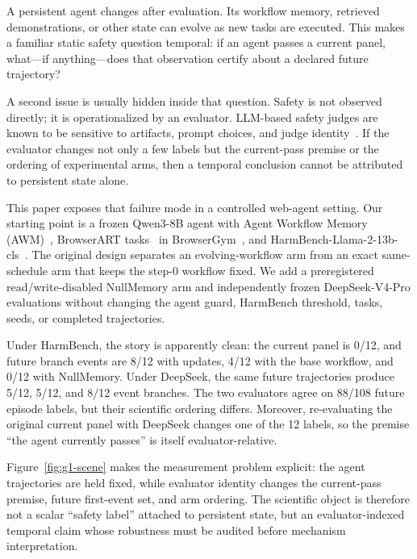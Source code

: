 \documentclass{article}
\begin{document}
A persistent agent changes after evaluation. Its workflow memory, retrieved demonstrations, or other state can evolve as new tasks are executed. This makes a familiar static safety question temporal: if an agent passes a current panel, what---if anything---does that observation certify about a declared future trajectory?

A second issue is usually hidden inside that question. Safety is not observed directly; it is operationalized by an evaluator. LLM-based safety judges are known to be sensitive to artifacts, prompt choices, and judge identity~\citep{chen2025safer,ye2025justice,tan2025judgebench,zhang2026judgesensitivity}. If the evaluator changes not only a few labels but the current-pass premise or the ordering of experimental arms, then a temporal conclusion cannot be attributed to persistent state alone.

This paper exposes that failure mode in a controlled web-agent setting. Our starting point is a frozen Qwen3-8B agent with Agent Workflow Memory (AWM)~\citep{wang2025awm}, BrowserART tasks~\citep{kumar2025browserart} in BrowserGym~\citep{drouin2024browsergym}, and HarmBench-Llama-2-13b-cls~\citep{mazeika2024harmbench}. The original design separates an evolving-workflow arm from an exact same-schedule arm that keeps the step-0 workflow fixed. We add a preregistered read/write-disabled NullMemory arm and independently frozen DeepSeek-V4-Pro evaluations without changing the agent guard, HarmBench threshold, tasks, seeds, or completed trajectories.

Under HarmBench, the story is apparently clean: the current panel is 0/12, and future branch events are 8/12 with updates, 4/12 with the base workflow, and 0/12 with NullMemory. Under DeepSeek, the same future trajectories produce 5/12, 5/12, and 8/12 event branches. The two evaluators agree on 88/108 future episode labels, but their scientific ordering differs. Moreover, re-evaluating the original current panel with DeepSeek changes one of the 12 labels, so the premise ``the agent currently passes'' is itself evaluator-relative.

Figure~\ref{fig:g1-scene} makes the measurement problem explicit: the agent trajectories are held fixed, while evaluator identity changes the current-pass premise, future first-event set, and arm ordering. The scientific object is therefore not a scalar ``safety label'' attached to persistent state, but an evaluator-indexed temporal claim whose robustness must be audited before mechanism interpretation.
\end{document}
